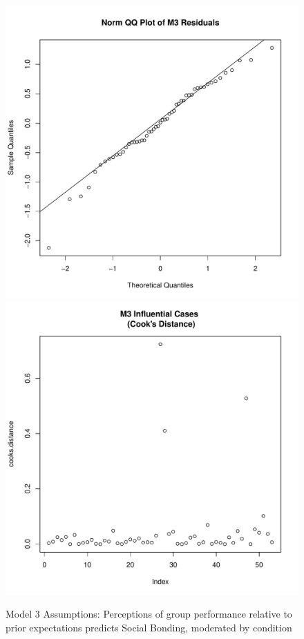 \begin{figure}[htbp]
    \includegraphics[scale =.4]{images/TEM3QQNorm.pdf}
    \includegraphics[scale =.4]{images/TEM3CooksD.pdf}
    \caption{Model 3 Assumptions: Perceptions of group performance relative to prior expectations predicts Social Bonding, moderated by condition}
    \label{fig:M3Assumptions}
\end{figure}


